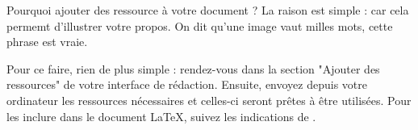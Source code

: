 Pourquoi ajouter des ressource à votre document ? La raison est simple : car cela permemt d'illustrer votre propos. On dit qu'une image vaut milles mots, cette phrase est vraie.

Pour ce faire, rien de plus simple : rendez-vous dans la section "Ajouter des ressources" de votre interface de rédaction. Ensuite, envoyez depuis votre ordinateur les ressources nécessaires et celles-ci seront prêtes à être utilisées. Pour les inclure dans le document \LaTeX, suivez les indications de .